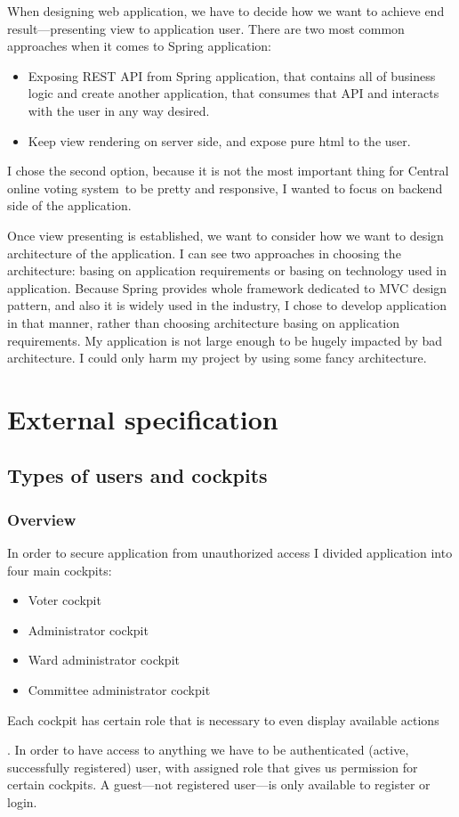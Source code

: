 \documentclass[a4paper,twoside,12pt]{book}
\newcommand{\ksremark}[1]{%
{%
{\color{brickred}{[\foreignlanguage{polish}{#1}]}}}%
\addcontentsline{rks}{uwagas}{\protect{\foreignlanguage{polish}{#1}}}%
}
\newcommand{\Title}{Central online voting system}
\begin{document}
    When designing web application, we have to decide how we want to achieve end result---presenting view to application user.
    There are two most common approaches when it comes to Spring application:
    \begin{itemize}
      \item Exposing REST API from Spring application, that contains all of business logic and create another application, that consumes that API and interacts with the user in any way desired.
      \item Keep view rendering on server side, and expose pure html to the user.
    \end{itemize}
    I chose the second option, because it is not the most important thing for \Title\ to be pretty and responsive, I wanted to focus on backend side of the application.

    Once view presenting is established, we want to consider how we want to design architecture of the application.
    I can see two approaches in choosing the architecture: basing on application requirements or basing on technology used in application.
    Because Spring provides whole framework dedicated to MVC design pattern, and also it is widely used in the industry, I chose to develop application in that manner,
    rather than choosing architecture basing on application requirements. 
    My application is not large enough to be hugely impacted by bad architecture. I could only harm my project by using some fancy architecture.

\chapter{External specification}
  \section{Types of users and cockpits}
    \subsection{Overview}
    In order to secure application from unauthorized access  I divided application into four main cockpits:
    \begin{itemize}
      \item Voter cockpit
      \item Administrator cockpit
      \item Ward administrator cockpit
      \item Committee administrator cockpit
    \end{itemize}
    Each cockpit has certain role that is necessary to even display available actions \ksremark{?}. 
    In order to have access to anything we have to be authenticated (active, successfully registered) user, with assigned role that gives us permission for certain cockpits.
    A guest---not registered user---is only available to register or login.
\end{document}
